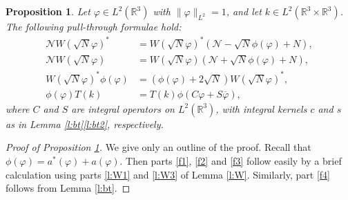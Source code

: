 \documentclass[11pt,a4paper]{scrartcl}
\newtheorem{prp}[thm]{Proposition}
\newcommand{\R}{\mathds{R}}
\newcommand{\N}{\mathcal{N}}
\begin{document}
\begin{prp} \label{p:f}
  Let $\varphi \in L^2(\R^3)$ with $\| \varphi \|_{L^2} = 1$, and let $k \in
  L^2(\R^3 \times \R^3)$. The following pull-through formulae hold:
  \begin{align}
    \N W(\sqrt{N} \varphi)^* & = W(\sqrt{N} \varphi)^* (\N - \sqrt{N}
    \phi(\varphi) + N), \tag{i} \label{f1} \\
    \N W(\sqrt{N} \varphi) & = W(\sqrt{N} \varphi) (\N + \sqrt{N}
    \phi(\varphi) + N), \tag{ii} \label{f2} \\
    W(\sqrt{N} \varphi)^* \phi(\varphi) & = (\phi(\varphi) + 2 \sqrt{N})
    W(\sqrt{N} \varphi)^*, \tag{iii} \label{f3} \\
    \phi(\varphi) T(k) & = T(k) \phi(C \varphi + S \overline{\varphi}),
    \tag{iv} \label{f4} 
  \end{align}
  where $C$ and $S$ are integral operators on $L^2(\R^3)$, with integral
  kernels $c$ and $s$ as in Lemma \ref{l:bt}\ref{l:bt2}, respectively.
\end{prp}


\begin{proof}[Proof of Proposition \ref{p:f}]
  We give only an outline of the proof. Recall that $\phi(\varphi) =
  a^*(\varphi) + a(\varphi)$. Then parts \eqref{f1}, \eqref{f2} and \eqref{f3}
  follow easily by a brief calculation using parts \ref{l:W1} and \ref{l:W3}
  of Lemma \ref{l:W}. Similarly, part \eqref{f4} follows from Lemma
  \ref{l:bt}.
\end{proof}
\end{document}
